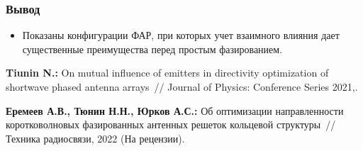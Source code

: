 \begin{frame}
    \frametitle{Вывод}
    \begin{itemize}
      \item Показаны конфигурации ФАР, при которых учет взаимного влияния дает существенные преимущества перед простым фазированием.
    \end{itemize}
    \vspace{4em}

    \textbf{Tiunin N.:} On mutual influence of emitters in directivity optimization of shortwave phased antenna arrays~// Journal of Physics: Conference Series 2021,.
    
\vspace{1em}

    \textbf{Еремеев А.В., Тюнин Н.Н., Юрков А.С.:} Об оптимизации направленности коротковолновых фазированных антенных решеток кольцевой структуры~// Техника радиосвязи, 2022 (На рецензии).
\end{frame} 